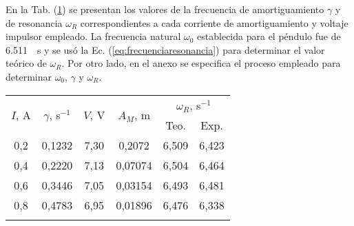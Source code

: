 En la Tab. (\ref{tab:gammas}) se presentan los valores de la frecuencia de amortiguamiento $\gamma$ y de resonancia $\omega_R$ correspondientes a cada corriente de amortiguamiento y
voltaje impulsor empleado. La frecuencia natural $\omega_0$ establecida para el péndulo fue
de \qty{6,511}{\per\second} y se usó la Ec. (\ref{eq:frecuenciaresonancia}) para determinar el
valor teórico de $\omega_R$. Por otro lado, en el anexo se especifica el proceso empleado
para determinar $\omega_0$, $\gamma$ y $\omega_R$. 

\begin{table}[H]
	\centering
	\begin{tabular}{c c c c c c}
		\toprule
		 \multirow{2}{*}{$I$, A} & \multirow{2}{*}{$\gamma$, s$^{-1}$} & \multirow{2}{*}{$V$, V} & \multirow{2}{*}{$A_M$, m} & \multicolumn{2}{c}{$\omega_R$, s$^{-1}$} \\
		\cmidrule(l){5-6}
		& & & & Teo. & Exp. \\
		\cmidrule(r){1-2} \cmidrule(l){3-6}
		0,2 & 0,1232 & 7,30 & 0,2072  & 6,509 & 6,423 \\
		0,4 & 0,2220 & 7,13 & 0,07074 & 6,504 & 6,464 \\
		0,6 & 0,3446 & 7,05 & 0,03154 & 6,493 & 6,481 \\
		0,8 & 0,4783 & 6,95 & 0,01896 & 6,476 & 6,338 \\
		\bottomrule
		\label{tab:gammas}
	\end{tabular}
\end{table}